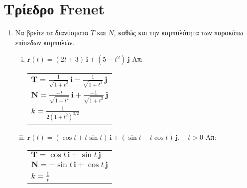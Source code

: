 \section*{Τρίεδρο Frenet}

\begin{enumerate}
  \item Να βρείτε τα διανύσματα $ T $ και $N$, καθώς και την καμπυλότητα των παρακάτω 
    επίπεδων καμπυλών.
    \begin{enumerate}[i)]
      \item $ \mathbf{r}(t)=(2t+3)\, \mathbf{i} + (5-t^{2})\, \mathbf{j} $ 
        \hfill Απ: \begin{tabular}{l}
          $ \mathbf{T} =  \frac{1}{\sqrt{1+t^{2}}}\,\mathbf{i} -
          \frac{1}{\sqrt{1+t^{2}}}\,\mathbf{j} $
          \\
          $ \mathbf{N}=  \frac{-t}{\sqrt{1+t^{2}}}\,\mathbf{i} + 
          \frac{-1}{\sqrt{1+t^{2}}} \,\mathbf{j} $ \\
          $ k= \frac{1}{2(1+t^{2})^{3/2}} $ 
        \end{tabular} 
      \item $ \mathbf{r}(t)=(\cos{t} + t \sin{t})\, \mathbf{i} + (\sin{t} - t
        \cos{t})\, \mathbf{j} , \quad t>0 $
        \hfill Απ: \begin{tabular}{l}
          $ \mathbf{T}=  \cos{t}\,\mathbf{i} + \sin{t}\,\mathbf{j} $ \\
          $ \mathbf{N}=  - \sin{t}\,\mathbf{i} + \cos{t}\,\mathbf{j} $ \\
          $ k = \frac{1}{t} $
        \end{tabular} 
    \end{enumerate}


\end{enumerate}
